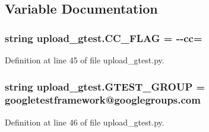 \subsection{Variable Documentation}
\subsubsection[{\texorpdfstring{C\+C\+\_\+\+F\+L\+AG}{CC_FLAG}}]{\setlength{\rightskip}{0pt plus 5cm}string upload\+\_\+gtest.\+C\+C\+\_\+\+F\+L\+AG = \textquotesingle{}-\/-\/{\bf cc}=\textquotesingle{}}\hypertarget{namespaceupload__gtest_a83f0946f9ee3731253fc622acd581fc2}{}\label{namespaceupload__gtest_a83f0946f9ee3731253fc622acd581fc2}


Definition at line 45 of file upload\+\_\+gtest.\+py.

\subsubsection[{\texorpdfstring{G\+T\+E\+S\+T\+\_\+\+G\+R\+O\+UP}{GTEST_GROUP}}]{\setlength{\rightskip}{0pt plus 5cm}string upload\+\_\+gtest.\+G\+T\+E\+S\+T\+\_\+\+G\+R\+O\+UP = \textquotesingle{}googletestframework@googlegroups.\+com\textquotesingle{}}\hypertarget{namespaceupload__gtest_af282f4c60bf6069ed0abf4e06d9b70ab}{}\label{namespaceupload__gtest_af282f4c60bf6069ed0abf4e06d9b70ab}


Definition at line 46 of file upload\+\_\+gtest.\+py.

